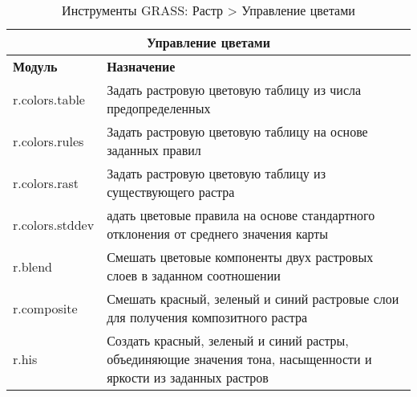 {\renewcommand{\arraystretch}{0.7}
\begin{table}[H]
\centering
 \begin{tabular}{|p{4cm}|p{10cm}|}
  \hline \multicolumn{2}{|c|}{\textbf{Управление цветами}} \\
  \hline \textbf{Модуль} & \textbf{Назначение} \\
  \hline r.colors.table & Задать растровую цветовую таблицу из числа
  предопределенных \\
  \hline r.colors.rules & Задать растровую цветовую таблицу на основе
  заданных правил \\
  \hline r.colors.rast & Задать растровую цветовую таблицу из
  существующего растра \\
  \hline r.colors.stddev & адать цветовые правила на основе
  стандартного отклонения от среднего значения карты \\
  \hline r.blend & Смешать цветовые компоненты двух растровых слоев в
  заданном соотношении \\
  \hline r.composite & Смешать красный, зеленый и синий растровые слои
  для получения композитного растра \\
  \hline r.his & Создать  красный, зеленый и синий растры, объединяющие
  значения тона, насыщенности и яркости из заданных растров \\
\hline
\end{tabular}
\caption{Инструменты GRASS: Растр > Управление цветами}
\end{table}}


